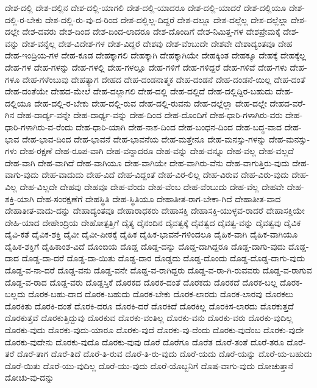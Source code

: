 {ದೇಶ-ದಲ್ಲಿ
ದೇಶ-ದಲ್ಲಿನ
ದೇಶ-ದಲ್ಲಿ-ಯಾಗಲಿ
ದೇಶ-ದಲ್ಲಿ-ಯಾದರೂ
ದೇಶ-ದಲ್ಲಿ-ಯಾದರೆ
ದೇಶ-ದಲ್ಲಿಯೂ
ದೇಶ-ದಲ್ಲಿ-ರ-ಬೇಕು
ದೇಶ-ದಲ್ಲಿ-ರು-ವು-ದ-ರಿಂದ
ದೇಶ-ದಲ್ಲಿಲ್ಲ-ದಿದ್ದರೆ
ದೇಶ-ದಲ್ಲೂ
ದೇಶ-ದಲ್ಲೆಲ್ಲ
ದೇಶ-ದಲ್ಲೆಲ್ಲಾ
ದೇಶ-ದಲ್ಲೇ
ದೇಶ-ದವರು
ದೇಶ-ದಿಂದ
ದೇಶ-ದಿಂದ-ಲಾದರೂ
ದೇಶ-ದೊಂದಿಗೆ
ದೇಶ-ನಿಮಿತ್ತ-ಗಳ
ದೇಶಪ್ರೇಮಕ್ಕೆ
ದೇಶ-ವನ್ನು
ದೇಶ-ವನ್ನೆಲ್ಲ
ದೇಶ-ವಿದೇಶ-ಗಳ
ದೇಶ-ವಿದ್ದರೆ
ದೇಶವು
ದೇಶ-ವೆಂಬುದೇ
ದೇಶವೇ
ದೇಶಾದ್ಯಂತವೂ
ದೇಹ
ದೇಹ-ಇಂದ್ರಿಯ-ಗಳ
ದೇಹ-ಕೂಡ
ದೇಹಕ್ಕಾಗಲಿ
ದೇಹಕ್ಕಾಗಿ
ದೇಹಕ್ಕಾಗಿಯೇ
ದೇಹಕ್ಕಿಂತ
ದೇಹಕ್ಕೂ
ದೇಹಕ್ಕೆ
ದೇಹಕ್ಕೆಲ್ಲ
ದೇಹ-ಗಳ
ದೇಹ-ಗಳನ್ನು
ದೇಹ-ಗಳಲ್ಲಿ
ದೇಹ-ಗಳಲ್ಲೂ
ದೇಹ-ಗಳಿಗೆ
ದೇಹ-ಗಳಿದ್ದರೆ
ದೇಹ-ಗಳಿವೆ
ದೇಹ-ಗಳು
ದೇಹ-ಗಳೂ
ದೇಹ-ಗಳೆಂಬುವು
ದೇಹತ್ಯಾಗ
ದೇಹದ
ದೇಹ-ದಂಡನಾತ್ಮಕ
ದೇಹ-ದಂಡನೆ
ದೇಹ-ದಂಡನೆ-ಯಿಲ್ಲ
ದೇಹ-ದಂತೆ
ದೇಹ-ದಂತೆಯೇ
ದೇಹದ-ಮೇಲೆ
ದೇಹ-ದಲ್ಲಾಗಲಿ
ದೇಹ-ದಲ್ಲಿ
ದೇಹ-ದಲ್ಲಿದೆ
ದೇಹ-ದಲ್ಲಿದ್ದಿರ-ಬಹುದು
ದೇಹ-ದಲ್ಲಿಯೂ
ದೇಹ-ದಲ್ಲಿ-ರ-ಬೇಕು
ದೇಹ-ದಲ್ಲಿ-ರುವ
ದೇಹ-ದಲ್ಲಿ-ರುವನು
ದೇಹ-ದಲ್ಲೆಲ್ಲಾ
ದೇಹ-ದಲ್ಲೇ
ದೇಹದ-ವರೆ-ಗಿನ
ದೇಹ-ದಾರ್ಡ್ಯ-ವನ್ನೇ
ದೇಹ-ದಾರ್ಢ್ಯ-ವನ್ನು
ದೇಹ-ದಿಂದ
ದೇಹ-ದೊಂದಿಗೆ
ದೇಹ-ಧಾರಿ-ಗಳಾಗಿರು-ವರು
ದೇಹ-ಧಾರಿ-ಗಳಾಗಿರು-ವ-ರೆಂದು
ದೇಹ-ಧಾರಿ-ಯಾಗಿ
ದೇಹ-ನಾಶ-ದಿಂದ
ದೇಹ-ಬಂಧನ-ದಿಂದ
ದೇಹ-ಬದ್ಧ-ವಾದ
ದೇಹ-ಭಾವ
ದೇಹ-ಭಾವ-ದಿಂದ
ದೇಹ-ಭಾವನೆ
ದೇಹ-ಭಾವನೆಯ
ದೇಹ-ಮತ್ತೇನೂ
ದೇಹ-ಮನಸ್ಸು-ಗಳನ್ನು
ದೇಹ-ಮನಸ್ಸು-ಗಳು
ದೇಹ-ರಕ್ಷಣೆ
ದೇಹ-ರೂಪ-ವಾಗಿ
ದೇಹ-ವನ್ನಾದರೂ
ದೇಹ-ವನ್ನು
ದೇಹ-ವನ್ನೂ
ದೇಹ-ವಲ್ಲ
ದೇಹ-ವಲ್ಲದೆ
ದೇಹ-ವಾಗಿ
ದೇಹ-ವಾಗಿದೆ
ದೇಹ-ವಾಗಿಯೂ
ದೇಹ-ವಾಗಿಯೇ
ದೇಹ-ವಾಗಿರು-ವೆನು
ದೇಹ-ವಾಗುತ್ತಿರು-ವುದು
ದೇಹ-ವಾಗು-ವುದು
ದೇಹ-ವಾದುದು
ದೇಹ-ವಿದೆ
ದೇಹ-ವಿದ್ದಂತೆ
ದೇಹ-ವಿರ-ಲಿಲ್ಲ
ದೇಹ-ವಿರುವ
ದೇಹ-ವಿರು-ವುದು
ದೇಹ-ವಿಲ್ಲ
ದೇಹ-ವಿಲ್ಲದೇ
ದೇಹವು
ದೇಹವೂ
ದೇಹ-ವೆಂದು
ದೇಹ-ವೆಂಬ
ದೇಹ-ವೆಂಬುದು
ದೇಹ-ವೆಲ್ಲ
ದೇಹವೇ
ದೇಹ-ಶಕ್ತಿ-ಯಾಗಿ
ದೇಹ-ಸಂರಕ್ಷಣೆಗೆ
ದೇಹಸ್ಥಿತಿ
ದೇಹ-ಸ್ಥಿತಿಯೂ
ದೇಹಾತೀತ-ರಾಗ-ಬೇಕಾ-ಗಿದೆ
ದೇಹಾತೀತ-ವಾದ
ದೇಹಾತೀತ-ವಾದು-ದನ್ನು
ದೇಹಾದ್ಯಂತವೂ
ದೇಹಾರಾಧಕರು
ದೇಹಾಸಕ್ತಿ
ದೇಹಾಸಕ್ತಿ-ಯುಳ್ಳವ-ರಾದರೆ
ದೇಹಾಸಕ್ತಿಯೇ
ದೇಹಿ-ಯಾದ
ದೇಹೇಂದ್ರಿಯ
ದೇಹೋತ್ಪತ್ತಿಗೆ
ದೈತ್ಯ
ದೈನಂದಿನ
ದೈವತ್ವಕ್ಕೆ
ದೈವತ್ವದ
ದೈವತ್ವ-ವನ್ನು
ದೈವತ್ವವು
ದೈವಿಕ
ದೈವಿ-ಕತೆ
ದೈವಿಕ-ಶಕ್ತಿ
ದೈವೀ
ದೈವೀ-ಪೀಠಕ್ಕೆ
ದೈಹಿಕ
ದೈಹಿಕ-ಭಾವನೆ-ಗಳಿಂದಲೂ
ದೈಹಿಕ-ವಾಗಿ
ದೈಹಿಕ-ವಾಗಿಯೂ
ದೈಹಿಕ-ಶಕ್ತಿಗೆ
ದೈಹಿಕಾಂಶ-ವಿದೆ
ದೊಂಬಿಯ
ದೊಡ್ಡ
ದೊಡ್ಡ-ದನ್ನು
ದೊಡ್ಡ-ದಾಗಿದ್ದರೂ
ದೊಡ್ಡ-ದಾಗು-ವುದು
ದೊಡ್ಡ-ದಾದ
ದೊಡ್ಡ-ದಾ-ದರೆ
ದೊಡ್ಡ-ದಾ-ಯಿತು
ದೊಡ್ಡ-ದಾರ
ದೊಡ್ಡದು
ದೊಡ್ಡ-ದೊಂದು
ದೊಡ್ಡ-ದೊಡ್ಡ-ದಾಗು-ವುದು
ದೊಡ್ಡ-ವ-ನಾ-ದರೆ
ದೊಡ್ಡ-ವನು
ದೊಡ್ಡ-ವನೇ
ದೊಡ್ಡ-ವ-ರಾಗಿದ್ದರು
ದೊಡ್ಡ-ವ-ರಾ-ಗಿ-ರುವವರು
ದೊಡ್ಡ-ವ-ರಾಗುವ
ದೊಡ್ಡ-ವ-ರಾದ
ದೊಡ್ಡ-ವರು
ದೊಡ್ಡಸ್ತಿಕೆ
ದೊರಕದ
ದೊರಕ-ದಂತೆ
ದೊರಕದು
ದೊರಕದೆ
ದೊರಕ-ಬಲ್ಲ
ದೊರಕ-ಬಲ್ಲದು
ದೊರಕ-ಬಹು-ದಾದ
ದೊರಕ-ಬಹುದು
ದೊರಕ-ಬೇಕು
ದೊರಕ-ಲಾರದು
ದೊರಕ-ಲಾರವು
ದೊರಕಲು
ದೊರಕಿತು
ದೊರಕಿ-ದಂತೆ
ದೊರಕಿ-ದರೂ
ದೊರಕಿ-ದರೆ
ದೊರಕಿದೆ
ದೊರಕಿಲ್ಲ
ದೊರಕಿಸ-ಲಾರದು
ದೊರಕುತ್ತದೆ
ದೊರಕುತ್ತವೆ
ದೊರಕುತ್ತಿದ್ದುವು
ದೊರಕುವ
ದೊರಕು-ವಂತಿಲ್ಲ
ದೊರಕು-ವನು
ದೊರಕು-ವರು
ದೊರಕು-ವುದಿಲ್ಲ
ದೊರಕು-ವುದು
ದೊರಕು-ವುದು-ಯಾರೂ
ದೊರಕು-ವುದೆ
ದೊರಕು-ವು-ದೆಂದು
ದೊರಕು-ವುದೆಂಬ
ದೊರಕು-ವುದೇ
ದೊರಕು-ವುದೇನು
ದೊರಕು-ವುದೊ
ದೊರಕು-ವುವು
ದೊರೆ
ದೊರೆಗೂ
ದೊರೆತ
ದೊರೆ-ತಂತೆ
ದೊರೆ-ತರೂ
ದೊರೆ-ತರೆ
ದೊರೆ-ತಾಗ
ದೊರೆ-ತಿದೆ
ದೊರೆ-ತಿ-ರುವ
ದೊರೆ-ತಿ-ರು-ವುದು
ದೊರೆ-ಯದು
ದೊರೆ-ಯನ್ನು
ದೊರೆ-ಯ-ಬಹುದು
ದೊರೆ-ಯಿತು
ದೊರೆ-ಯು-ವುದಿಲ್ಲ
ದೊರೆ-ಯು-ವುದು
ದೊರೆ-ಯೊಬ್ಬನಿಗೆ
ದೊಷ-ವಾಗು-ವುದು
ದೋಚುತ್ತಾನೆ
ದೋಚು-ವು-ದನ್ನು
}
